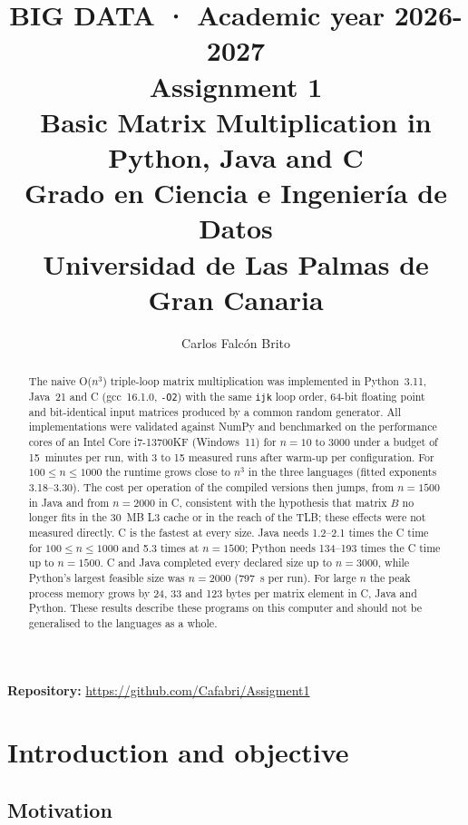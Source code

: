 \documentclass[12pt,a4paper]{article}
\title{
    \large \textbf{BIG DATA · Academic year 2026-2027} \\[0.4em]
    \LARGE Assignment 1 \\
    \Large Basic Matrix Multiplication in Python, Java and C \\[0.4em]
    \small Grado en Ciencia e Ingeniería de Datos \\
    \small Universidad de Las Palmas de Gran Canaria
}
\author{Carlos Falcón Brito}
\date{}
\begin{document}
\maketitle
\thispagestyle{empty}

\begin{center}
\textbf{Repository:} \url{https://github.com/Cafabri/Assigment1}
\end{center}


\begin{abstract}
\noindent
The naive O($n^3$) triple-loop matrix multiplication was implemented in Python~3.11,
Java~21 and C (gcc~16.1.0, \texttt{-O2}) with the same \texttt{ijk} loop order, 64-bit
floating point and bit-identical input matrices produced by a common random generator.
All implementations were validated against NumPy and benchmarked on the performance
cores of an Intel Core i7-13700KF (Windows~11) for $n = 10$ to $3000$ under a budget of
15~minutes per run, with 3 to 15 measured runs after warm-up per configuration. For
$100 \le n \le 1000$ the runtime grows close to $n^3$ in the three languages (fitted
exponents 3.18--3.30). The cost per operation of the compiled versions then jumps, from
$n = 1500$ in Java and from $n = 2000$ in C, consistent with the hypothesis that matrix
$B$ no longer fits in the 30~MB L3 cache or in the reach of the TLB; these effects were
not measured directly. C is the fastest at every size. Java needs 1.2--2.1 times the C
time for $100 \le n \le 1000$ and 5.3 times at $n = 1500$; Python needs 134--193 times
the C time up to $n = 1500$. C and Java completed every declared size up to $n = 3000$,
while Python's largest feasible size was $n = 2000$ (797~s per run). For large $n$ the
peak process memory grows by 24, 33 and 123 bytes per matrix element in C, Java and
Python. These results describe these programs on this computer and should not be
generalised to the languages as a whole.
\end{abstract}


\newpage

\section{Introduction and objective}

\subsection{Motivation}
\end{document}
